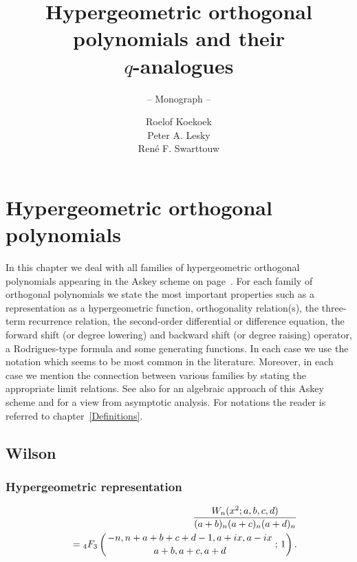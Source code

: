 \documentclass[envcountchap,graybox]{svmono}
\newcounter{rom}
\newcommand{\hyp}[5]{\mbox{}_{#1}{F}_{#2}
\left(\genfrac{}{}{0pt}{}{#3}{#4}\,;\,#5\right)}
\begin{document}
\author{Roelof Koekoek\\[2.5mm]Peter A. Lesky\\[2.5mm]Ren\'e F. Swarttouw}
\title{Hypergeometric orthogonal polynomials and their\\$q$-analogues}
\subtitle{-- Monograph --}
\maketitle

\frontmatter

\large

\addtocounter{chapter}{8}
\chapter{Hypergeometric orthogonal polynomials}
\label{HyperOrtPol}


In this chapter we deal with all families of hypergeometric orthogonal polynomials
appearing in the Askey scheme on page~\pageref{scheme}. For each family of orthogonal
polynomials we state the most important properties such as a representation as a
hypergeometric function, orthogonality relation(s), the three-term recurrence relation,
the second-order differential or difference equation, the forward shift (or degree lowering)
and backward shift (or degree raising) operator, a Rodrigues-type formula and some generating
functions. In each case we use the notation which seems to be most common in the literature.
Moreover, in each case we mention the connection between various families by stating the
appropriate limit relations. See also \cite{Terwilliger2006} for an algebraic approach of
this Askey scheme and \cite{TemmeLopez2001} for a view from asymptotic analysis.
For notations the reader is referred to chapter~\ref{Definitions}.

\section{Wilson}

\par

\subsection*{Hypergeometric representation}
\begin{eqnarray}
\label{DefWilson}
& &\frac{W_n(x^2;a,b,c,d)}{(a+b)_n(a+c)_n(a+d)_n}\nonumber\\
& &{}=\hyp{4}{3}{-n,n+a+b+c+d-1,a+ix,a-ix}{a+b,a+c,a+d}{1}.
\end{eqnarray}
\end{document}
